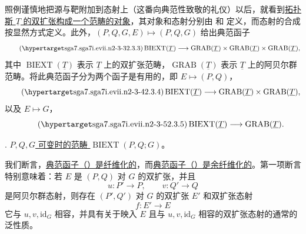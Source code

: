 照例谨慎地把源与靶附加到态射上（这番向典范性致敬的礼仪）以后，就看到\underline{拓扑斯 $\underline T$ 的双扩张构成一个范畴的对象}，其对象和态射分别由  和  定义，而态射的合成按显然方式定义。此外，$(P,Q,G,E)\mapsto(P,Q,G)$ 给出典范函子
\begin{equation}\tag{\SGARefTarget{sga7.sga7i.evii.n2-3-3}{2.3.3}}
 \operatorname{BIEXT}(\underline T)
 \longrightarrow
 \operatorname{GRAB}(\underline T)\times
 \operatorname{GRAB}(\underline T)\times
 \operatorname{GRAB}(\underline T),
\end{equation}
其中 $\operatorname{BIEXT}(\underline T)$ 表示 $\underline T$ 上的双扩张范畴，$\operatorname{GRAB}(\underline T)$ 表示 $\underline T$ 上的阿贝尔群范畴。将此典范函子分为两个函子是有用的，即 $E\mapsto(P,Q)$，
\begin{equation}\tag{\SGARefTarget{sga7.sga7i.evii.n2-3-4}{2.3.4}}
 \operatorname{BIEXT}(\underline T)
 \longrightarrow
 \operatorname{GRAB}(\underline T)\times
 \operatorname{GRAB}(\underline T),
\end{equation}
以及 $E\mapsto G$，
\begin{equation}\tag{\SGARefTarget{sga7.sga7i.evii.n2-3-5}{2.3.5}}
 \operatorname{BIEXT}(\underline T)
 \longrightarrow
 \operatorname{GRAB}(\underline T).
\end{equation}





. \underline{$P,Q,G$ 可变时的范畴 $\operatorname{BIEXT}(P,Q;G)$}。

我们断言，\underline{典范函子（）是纤维化的}，而\underline{典范函子（）是余纤维化的}。第一项断言特别意味着：若 $E$ 是 $(P,Q)$ 对 $G$ 的双扩张，并且
\[
 u:P'\longrightarrow P,\qquad v:Q'\longrightarrow Q
\]
是阿贝尔群态射，则存在 $(P',Q')$ 对 $G$ 的双扩张 $E'$ 和双扩张态射
\[
 f:E'\longrightarrow E
\]
它与 $u,v,\mathrm{id}_G$ 相容，并具有关于映入 $E$ 且与 $u,v,\mathrm{id}_G$ 相容的双扩张态射的通常的泛性质。

